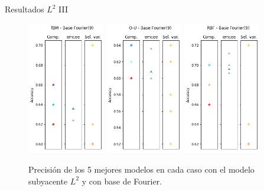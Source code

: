\documentclass[10pt, spanish, professionalfonts]{beamer}
\begin{document}
\begin{frame}{Resultados \(L^2\) III}
  \begin{figure}
    \includegraphics[width=0.3\textwidth]{img/results/log_l2_fbm_base9}\hfill
    \includegraphics[width=0.3\textwidth]{img/results/log_l2_ou_base9}\hfill
    \includegraphics[width=0.3\textwidth]{img/results/log_l2_rbf_base9}
    \caption{Precisión de los 5 mejores modelos en cada caso con el modelo subyacente \(L^2\) y con base de Fourier.}
  \end{figure}
\end{frame}
\end{document}
